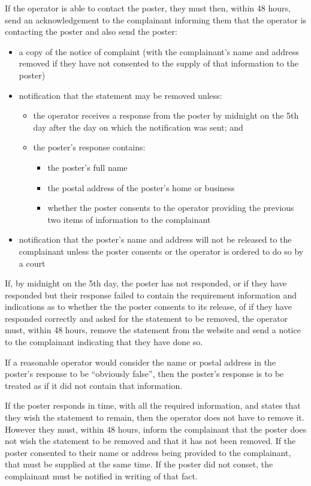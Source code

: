 \documentclass[]{article}
\begin{document}
If the operator is able to contact the poster, they must then, within 48 hours, send an acknowledgement to the complainant informing them that the operator is contacting the poster and also send the poster:

\begin{itemize}
\item a copy of the notice of complaint (with the complainant's name and address removed if they have not consented to the supply of that information to the poster)
\item notification that the statement may be removed unless:
  \begin{itemize}
  \item the operator receives a response from the poster by midnight on the 5th day after the day on which the notification was sent; and
  \item the poster's response contains:
    \begin{itemize}
    \item the poster's full name
    \item the postal address of the poster's home or business
    \item whether the poster consents to the operator providing the previous two items of information to the complainant
    \end{itemize}
  \end{itemize}
\item notification that the poster's name and address will not be released to the complainant unless the poster consents or the operator is ordered to do so by a court
\end{itemize}

If, by midnight on the 5th day, the poster has not responded, or if they have responded but their response failed to contain the requirement information and indications as to whether the the poster consents to its release, of if they have responded correctly and asked for the statement to be removed, the operator must, within 48 hours, remove the statement from the website and send a notice to the complainant indicating that they have done so. 

If a reasonable operator would consider the name or postal address in the poster's response to be ``obviously false'', then the poster's response is to be treated as if it did not contain that information.

If the poster responds in time, with all the required information, and states that they wish the statement to remain, then the operator does not have to remove it. However they must, within 48 hours, inform the complainant that the poster does not wish the statement to be removed and that it has not been removed. If the poster consented to their name or address being provided to the complainant, that must be supplied at the same time. If the poster did not conset, the complainant must be notified in writing of that fact.
\end{document}
